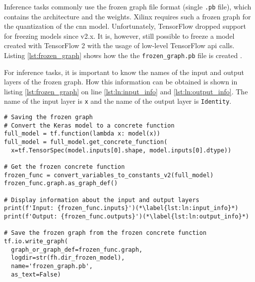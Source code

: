 Inference tasks commonly use the frozen graph file format (single \texttt{.pb} file), which contains the architecture and the weights.
Xilinx requires such a frozen graph for the quantization of the \acrshort{cnn} model.
Unfortunately, TensorFlow dropped support for freezing models since v2.x.
It is, however, still possible to freeze a model created with TensorFlow 2 with the usage of low-level TensorFlow \acrshort{api} calls.
Listing \ref{lst:frozen_graph} shows how the the \texttt{frozen\_graph.pb} file is created \cite{training_train_frozen}.

For inference tasks, it is important to know the names of the input and output layers of the frozen graph.
How this information can be obtained is shown in listing \ref{lst:frozen_graph} on line \ref{lst:ln:input_info} and \ref{lst:ln:output_info}.
The name of the input layer is \texttt{x} and the name of the output layer is \texttt{Identity}.

\clearpage

\begin{lstlisting}[style=python, caption={Saving the model in the frozen graph file format \cite{training_train_frozen}}, label=lst:frozen_graph]
# Saving the frozen graph
# Convert the Keras model to a concrete function
full_model = tf.function(lambda x: model(x))
full_model = full_model.get_concrete_function(
  x=tf.TensorSpec(model.inputs[0].shape, model.inputs[0].dtype))

# Get the frozen concrete function
frozen_func = convert_variables_to_constants_v2(full_model)
frozen_func.graph.as_graph_def()

# Display information about the input and output layers
print(f'Input: {frozen_func.inputs}')(*\label{lst:ln:input_info}*)
print(f'Output: {frozen_func.outputs}')(*\label{lst:ln:output_info}*)

# Save the frozen graph from the frozen concrete function
tf.io.write_graph(
  graph_or_graph_def=frozen_func.graph,
  logdir=str(fh.dir_frozen_model),
  name='frozen_graph.pb',
  as_text=False)
\end{lstlisting}
